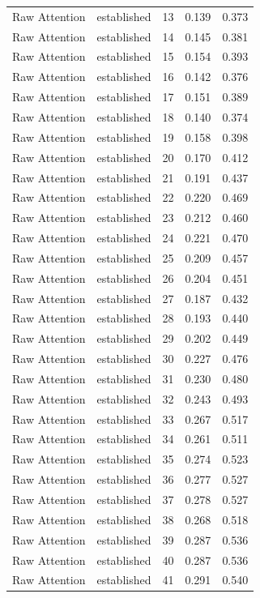 \begin{tabular}{llrrr}
Raw Attention & established & 13 & 0.139 & 0.373 \\
Raw Attention & established & 14 & 0.145 & 0.381 \\
Raw Attention & established & 15 & 0.154 & 0.393 \\
Raw Attention & established & 16 & 0.142 & 0.376 \\
Raw Attention & established & 17 & 0.151 & 0.389 \\
Raw Attention & established & 18 & 0.140 & 0.374 \\
Raw Attention & established & 19 & 0.158 & 0.398 \\
Raw Attention & established & 20 & 0.170 & 0.412 \\
Raw Attention & established & 21 & 0.191 & 0.437 \\
Raw Attention & established & 22 & 0.220 & 0.469 \\
Raw Attention & established & 23 & 0.212 & 0.460 \\
Raw Attention & established & 24 & 0.221 & 0.470 \\
Raw Attention & established & 25 & 0.209 & 0.457 \\
Raw Attention & established & 26 & 0.204 & 0.451 \\
Raw Attention & established & 27 & 0.187 & 0.432 \\
Raw Attention & established & 28 & 0.193 & 0.440 \\
Raw Attention & established & 29 & 0.202 & 0.449 \\
Raw Attention & established & 30 & 0.227 & 0.476 \\
Raw Attention & established & 31 & 0.230 & 0.480 \\
Raw Attention & established & 32 & 0.243 & 0.493 \\
Raw Attention & established & 33 & 0.267 & 0.517 \\
Raw Attention & established & 34 & 0.261 & 0.511 \\
Raw Attention & established & 35 & 0.274 & 0.523 \\
Raw Attention & established & 36 & 0.277 & 0.527 \\
Raw Attention & established & 37 & 0.278 & 0.527 \\
Raw Attention & established & 38 & 0.268 & 0.518 \\
Raw Attention & established & 39 & 0.287 & 0.536 \\
Raw Attention & established & 40 & 0.287 & 0.536 \\
Raw Attention & established & 41 & 0.291 & 0.540 \\

\end{tabular}
